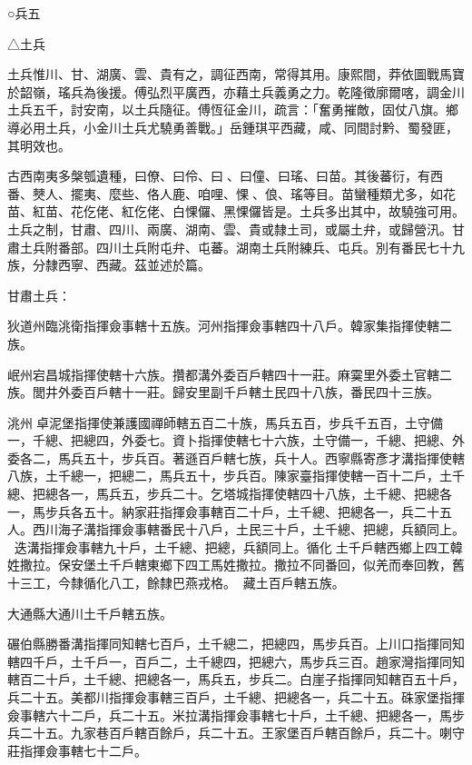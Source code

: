 
\begin{pinyinscope}
○兵五

△土兵

土兵惟川、甘、湖廣、雲、貴有之，調征西南，常得其用。康熙間，莽依圖戰馬寶於韶嶺，瑤兵為後援。傅弘烈平廣西，亦藉土兵義勇之力。乾隆徵廓爾喀，調金川土兵五千，討安南，以土兵隨征。傅恆征金川，疏言：「奮勇摧敵，固仗八旗。鄉導必用土兵，小金川土兵尤驍勇善戰。」岳鍾琪平西藏，咸、同間討黔、蜀發匪，其明效也。

古西南夷多槃瓠遺種，曰僚、曰伶、曰、曰僮、曰瑤、曰苗。其後蕃衍，有西番、僰人、擺夷、麼些、佫人鹿、咱哩、惈、俍、瑤等目。苗蠻種類尤多，如花苗、紅苗、花仡佬、紅仡佬、白惈儸、黑惈儸皆是。土兵多出其中，故驍強可用。土兵之制，甘肅、四川、兩廣、湖南、雲、貴或隸土司，或屬土弁，或歸營汛。甘肅土兵附番部。四川土兵附屯弁、屯蕃。湖南土兵附練兵、屯兵。別有番民七十九族，分隸西寧、西藏。茲並述於篇。

甘肅土兵：

狄道州臨洮衛指揮僉事轄十五族。河州指揮僉事轄四十八戶。韓家集指揮使轄二族。

岷州宕昌城指揮使轄十六族。攢都溝外委百戶轄四十一莊。麻霙里外委土官轄二族。閭井外委百戶轄十一莊。歸安里副千戶轄土民四十八族，番民四十三族。

洮州卓泥堡指揮使兼護國禪師轄五百二十族，馬兵五百，步兵千五百，土守備一，千總、把總四，外委七。資卜指揮使轄七十六族，土守備一，千總、把總、外委各二，馬兵五十，步兵百。著遜百戶轄七族，兵十人。西寧縣寄彥才溝指揮使轄八族，土千總一，把總二，馬兵五十，步兵百。陳家臺指揮使轄一百十二戶，土千總、把總各一，馬兵五，步兵二十。乞塔城指揮使轄四十八族，土千總、把總各一，馬步兵各五十。納家莊指揮僉事轄百二十戶，土千總、把總各一，兵二十五人。西川海子溝指揮僉事轄番民十八戶，土民三十戶，土千總、把總，兵額同上。迭溝指揮僉事轄九十戶，土千總、把總，兵額同上。循化土千戶轄西鄉上四工韓姓撒拉。保安堡土千戶轄東鄉下四工馬姓撒拉。撒拉不同番回，似羌而奉回教，舊十三工，今隸循化八工，餘隸巴燕戎格。藏土百戶轄五族。

大通縣大通川土千戶轄五族。

碾伯縣勝番溝指揮同知轄七百戶，土千總二，把總四，馬步兵百。上川口指揮同知轄四千戶，土千戶一，百戶二，土千總四，把總六，馬步兵三百。趙家灣指揮同知轄百二十戶，土千總、把總各一，馬兵五，步兵二。白崖子指揮同知轄百五十戶，兵二十五。美都川指揮僉事轄三百戶，土千總、把總各一，兵二十五。硃家堡指揮僉事轄六十二戶，兵二十五。米拉溝指揮僉事轄七十戶，土千總、把總各一，馬步兵二十五。九家巷百戶轄百餘戶，兵二十五。王家堡百戶轄百餘戶，兵二十。喇守莊指揮僉事轄七十二戶。


\end{pinyinscope}
